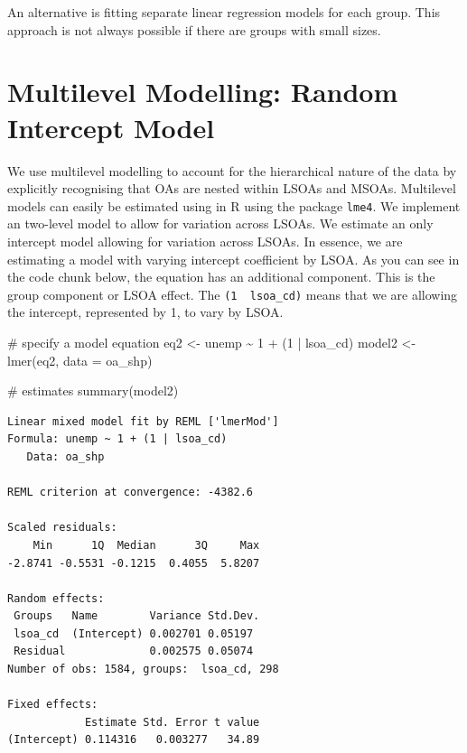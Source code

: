 \documentclass[
  letterpaper,
  DIV=11,
  numbers=noendperiod,
  oneside]{scrreprt}
\newenvironment{Shaded}{\begin{snugshade}}{\end{snugshade}}
\newcommand{\AttributeTok}[1]{\textcolor[rgb]{0.40,0.45,0.13}{#1}}
\newcommand{\CommentTok}[1]{\textcolor[rgb]{0.37,0.37,0.37}{#1}}
\newcommand{\DecValTok}[1]{\textcolor[rgb]{0.68,0.00,0.00}{#1}}
\newcommand{\FunctionTok}[1]{\textcolor[rgb]{0.28,0.35,0.67}{#1}}
\newcommand{\NormalTok}[1]{\textcolor[rgb]{0.00,0.23,0.31}{#1}}
\newcommand{\OtherTok}[1]{\textcolor[rgb]{0.00,0.23,0.31}{#1}}
\newcommand{\SpecialCharTok}[1]{\textcolor[rgb]{0.37,0.37,0.37}{#1}}
\begin{document}
An alternative is fitting separate linear regression models for each
group. This approach is not always possible if there are groups with
small sizes.

\section{Multilevel Modelling: Random Intercept
Model}\label{multilevel-modelling-random-intercept-model}

We use multilevel modelling to account for the hierarchical nature of
the data by explicitly recognising that OAs are nested within LSOAs and
MSOAs. Multilevel models can easily be estimated using in R using the
package \texttt{lme4}. We implement an two-level model to allow for
variation across LSOAs. We estimate an only intercept model allowing for
variation across LSOAs. In essence, we are estimating a model with
varying intercept coefficient by LSOA. As you can see in the code chunk
below, the equation has an additional component. This is the group
component or LSOA effect. The \texttt{(1\ \textbar{}\ lsoa\_cd)} means
that we are allowing the intercept, represented by 1, to vary by LSOA.

\begin{Shaded}
\begin{Highlighting}[]
\CommentTok{\# specify a model equation}
\NormalTok{eq2 }\OtherTok{\textless{}{-}}\NormalTok{ unemp }\SpecialCharTok{\textasciitilde{}} \DecValTok{1} \SpecialCharTok{+}\NormalTok{ (}\DecValTok{1} \SpecialCharTok{|}\NormalTok{ lsoa\_cd)}
\NormalTok{model2 }\OtherTok{\textless{}{-}} \FunctionTok{lmer}\NormalTok{(eq2, }\AttributeTok{data =}\NormalTok{ oa\_shp)}

\CommentTok{\# estimates}
\FunctionTok{summary}\NormalTok{(model2)}
\end{Highlighting}
\end{Shaded}

\begin{verbatim}
Linear mixed model fit by REML ['lmerMod']
Formula: unemp ~ 1 + (1 | lsoa_cd)
   Data: oa_shp

REML criterion at convergence: -4382.6

Scaled residuals: 
    Min      1Q  Median      3Q     Max 
-2.8741 -0.5531 -0.1215  0.4055  5.8207 

Random effects:
 Groups   Name        Variance Std.Dev.
 lsoa_cd  (Intercept) 0.002701 0.05197 
 Residual             0.002575 0.05074 
Number of obs: 1584, groups:  lsoa_cd, 298

Fixed effects:
            Estimate Std. Error t value
(Intercept) 0.114316   0.003277   34.89
\end{verbatim}
\end{document}
